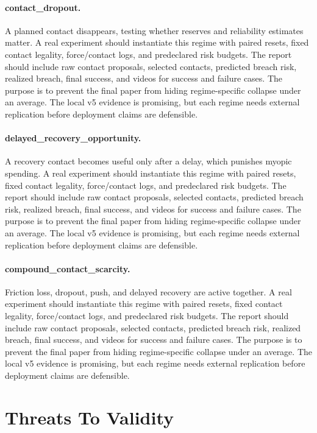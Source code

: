 \documentclass{article}
\begin{document}
\paragraph{contact\_dropout.} A planned contact disappears, testing whether reserves and reliability estimates matter. A real experiment should instantiate this regime with paired resets, fixed contact legality, force/contact logs, and predeclared risk budgets. The report should include raw contact proposals, selected contacts, predicted breach risk, realized breach, final success, and videos for success and failure cases.
The purpose is to prevent the final paper from hiding regime-specific collapse under an average. The local v5 evidence is promising, but each regime needs external replication before deployment claims are defensible.
\paragraph{delayed\_recovery\_opportunity.} A recovery contact becomes useful only after a delay, which punishes myopic spending. A real experiment should instantiate this regime with paired resets, fixed contact legality, force/contact logs, and predeclared risk budgets. The report should include raw contact proposals, selected contacts, predicted breach risk, realized breach, final success, and videos for success and failure cases.
The purpose is to prevent the final paper from hiding regime-specific collapse under an average. The local v5 evidence is promising, but each regime needs external replication before deployment claims are defensible.
\paragraph{compound\_contact\_scarcity.} Friction loss, dropout, push, and delayed recovery are active together. A real experiment should instantiate this regime with paired resets, fixed contact legality, force/contact logs, and predeclared risk budgets. The report should include raw contact proposals, selected contacts, predicted breach risk, realized breach, final success, and videos for success and failure cases.
The purpose is to prevent the final paper from hiding regime-specific collapse under an average. The local v5 evidence is promising, but each regime needs external replication before deployment claims are defensible.
\clearpage
\section{Threats To Validity}
\end{document}
